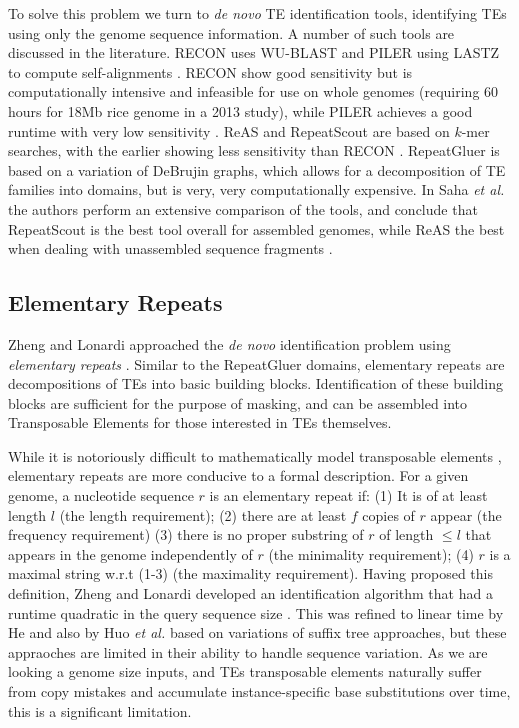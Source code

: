 \documentclass{bmcart}
\begin{document}
To solve this problem we turn to {\it de novo} TE identification
tools, identifying TEs using only the genome sequence information.  A
number of such tools are discussed in the literature.  RECON uses
WU-BLAST and PILER using LASTZ to compute self-alignments
\cite{Bao:2002,Edgar:2005p2365,Lopez:2003td,Harris:2007uf}.  RECON
show good sensitivity but is computationally intensive and infeasible
for use on whole genomes (requiring 60 hours for 18Mb rice genome in a
2013 study), while PILER achieves a good runtime with very low
sensitivity .  ReAS and RepeatScout \cite{Price:2005p1247} are based
on $k$-mer searches, with the earlier showing less sensitivity than
RECON \cite{Li:2005he, Price:2005p1247,Jiang:2013jt}.  RepeatGluer
\cite{Pevzner:2004p3157,Zhi:2006p3199} is based on a variation of
DeBrujin graphs, which allows for a decomposition of TE families into
domains, but is very, very computationally expensive.  In Saha {\it et
  al.} the authors perform an extensive comparison of the tools, and
conclude that RepeatScout is the best tool overall for assembled
genomes, while ReAS the best when dealing with unassembled sequence
fragments \cite{Saha:2008dm}.


\subsection*{Elementary Repeats}
Zheng and Lonardi approached the {\it de novo} identification problem using {\it elementary repeats}
\cite{Zheng:2005bl}.
Similar to the RepeatGluer domains, elementary repeats are
decompositions of TEs into basic building blocks.  Identification of
these building blocks are sufficient for the purpose
of masking, and can be assembled into Transposable Elements for those
interested in TEs themselves.

While it is notoriously difficult to mathematically model transposable
elements \cite{Bao:2002}, elementary repeats are more conducive to a
formal description.  For a given genome, a nucleotide sequence $r$ is
an elementary repeat if: (1) It is of at least length $l$ (the length
requirement); (2) there are at least $f$ copies of $r$ appear (the
frequency requirement) (3) there is no proper substring of $r$ of
length $\leq l$ that appears in the genome independently of $r$ (the
minimality requirement); (4) $r$ is a maximal string w.r.t (1-3) (the
maximality requirement).  Having proposed this definition, Zheng and
Lonardi developed an identification algorithm that had a runtime
quadratic in the query sequence size \cite{Zheng:2005bl}. This was
refined to linear time by He and also by Huo {\it et al.}
\cite{He:2006gpa,Huo:2009hoa} based on variations of suffix tree
approaches, but these appraoches are limited in their ability to handle sequence
variation.  As we are looking a genome size inputs, and TEs
transposable elements naturally suffer from copy mistakes and
accumulate instance-specific base substitutions over time, this is a
significant limitation.
\end{document}
